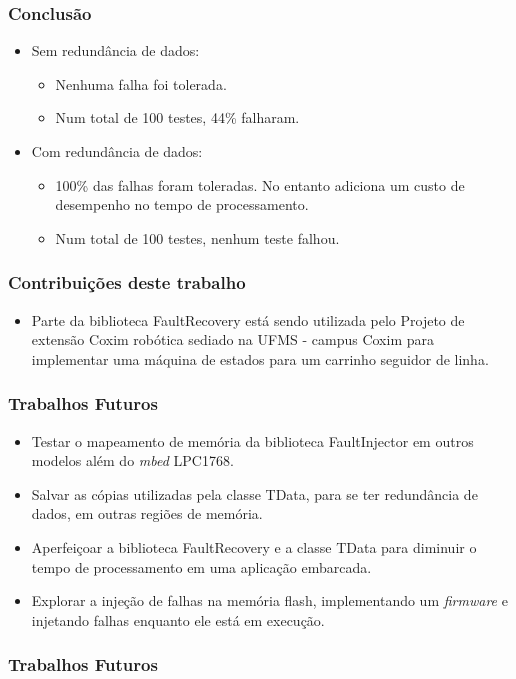 \begin{frame}
	\frametitle{Conclusão}
	\begin{itemize}
		\item Sem redundância de dados:
		\begin{itemize}			
			\item Nenhuma falha foi tolerada.
			\item Num total de 100 testes, 44\% falharam.
		\end{itemize}
		\item Com redundância de dados:
		\begin{itemize}
			\item 100\% das falhas foram toleradas. No entanto adiciona um custo de desempenho no tempo de processamento. 
			\item Num total de 100 testes, nenhum teste falhou.
		\end{itemize}
	\end{itemize}
\end{frame}

\begin{frame}
	\frametitle{Contribuições deste trabalho}
	\begin{itemize}
		\item Parte da biblioteca FaultRecovery está sendo utilizada pelo Projeto de extensão Coxim robótica sediado na UFMS - campus Coxim para implementar uma máquina de estados para um carrinho seguidor de linha.
	\end{itemize}
\end{frame}

\begin{frame}
	\frametitle{Trabalhos Futuros}
	\begin{itemize}
		\item Testar o mapeamento de memória da biblioteca FaultInjector em outros modelos além do \textit{mbed} LPC1768.
		\item Salvar as cópias utilizadas pela classe TData, para se ter redundância de dados, em outras regiões de memória.
		\item Aperfeiçoar a biblioteca FaultRecovery e a classe TData para diminuir o tempo de processamento em uma aplicação embarcada.
		\item Explorar a injeção de falhas na memória flash, implementando um \textit{firmware} e injetando falhas enquanto ele está em execução.
	\end{itemize}
\end{frame}

\begin{frame}
	\frametitle{Trabalhos Futuros}
		\centering {}
\end{frame}

